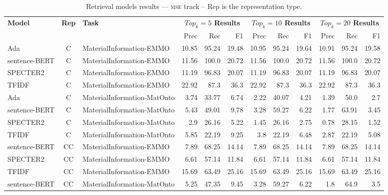 
    \begin{table}[h]
         \centering
         \caption{Retrieval models results --- \textsc{mse} track -- Rep is the representation type.} \label{tab:ir_mse}
         \begin{tabular}{|l|c|l|r|r|r|r|r|r|r|r|r|}
             \hline
             \multirow{2}{*}{\textbf{Model}}  & \multirow{2}{*}{\textbf{Rep}}  & \multirow{2}{*}{\textbf{Task}} &  \multicolumn{3}{c|}{\textbf{$Top_k=5$ Results}} &  \multicolumn{3}{c|}{\textbf{$Top_k=10$ Results}} &  \multicolumn{3}{c|}{\textbf{$Top_k=20$ Results}}\\
             \cline{4-12}
              & & & Prec & Rec & F1& Prec & Rec & F1& Prec & Rec & F1 \\
             \hline
    	Ada  & C & MaterialInformation-EMMO  & 10.85 & 95.24 & 19.48 & 10.95 & 95.24 & 19.64 & 10.91 & 95.24 & 19.58\\
	sentence-BERT  & C & MaterialInformation-EMMO  & 11.56 & 100.0 & 20.72 & 11.56 & 100.0 & 20.72 & 11.56 & 100.0 & 20.72\\
	SPECTER2  & C & MaterialInformation-EMMO  & 11.19 & 96.83 & 20.07 & 11.19 & 96.83 & 20.07 & 11.19 & 96.83 & 20.07\\
	TFIDF  & C & MaterialInformation-EMMO  & 22.92 & 87.3 & 36.3 & 22.92 & 87.3 & 36.3 & 22.92 & 87.3 & 36.3\\
	\hline
	Ada  & C & MaterialInformation-MatOnto  & 3.74 & 33.77 & 6.74 & 2.22 & 40.07 & 4.21 & 1.39 & 50.0 & 2.7\\
	sentence-BERT  & C & MaterialInformation-MatOnto  & 5.43 & 49.01 & 9.78 & 3.28 & 59.27 & 6.22 & 1.77 & 63.91 & 3.45\\
	SPECTER2  & C & MaterialInformation-MatOnto  & 2.9 & 26.16 & 5.22 & 1.45 & 26.16 & 2.75 & 0.78 & 28.15 & 1.52\\
	TFIDF  & C & MaterialInformation-MatOnto  & 5.85 & 22.19 & 9.25 & 3.8 & 22.19 & 6.48 & 2.87 & 22.19 & 5.08\\
	\hline
	sentence-BERT  & CC & MaterialInformation-EMMO  & 7.89 & 68.25 & 14.14 & 7.89 & 68.25 & 14.14 & 7.89 & 68.25 & 14.14\\
	SPECTER2  & CC & MaterialInformation-EMMO  & 6.61 & 57.14 & 11.84 & 6.61 & 57.14 & 11.84 & 6.61 & 57.14 & 11.84\\
	TFIDF  & CC & MaterialInformation-EMMO  & 15.69 & 63.49 & 25.16 & 15.69 & 63.49 & 25.16 & 15.69 & 63.49 & 25.16\\
	\hline
	sentence-BERT  & CC & MaterialInformation-MatOnto  & 5.25 & 47.35 & 9.45 & 3.28 & 59.27 & 6.22 & 1.8 & 64.9 & 3.5\\

\end{tabular}
\end{table}
